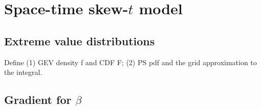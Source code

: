 \chapter{Space-time skew-$t$ model}

\section{Extreme value distributions}
Define (1) GEV density f and CDF F; (2) PS pdf  and the grid approximation to the integral.

\section{Gradient for $\beta$}